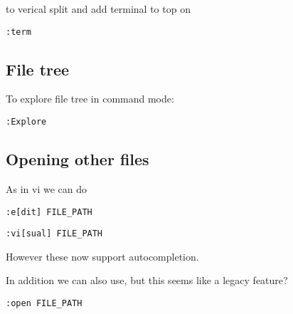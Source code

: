 to verical split and add terminal to top on
\begin{verbatim}
:term
\end{verbatim}


\subsection{File tree}

To explore file tree in command mode:
\begin{verbatim}
:Explore
\end{verbatim}


\subsection{Opening other files}

As in vi we can do 
\begin{verbatim}
:e[dit] FILE_PATH
\end{verbatim}

\begin{verbatim}
:vi[sual] FILE_PATH
\end{verbatim}

However these now support autocompletion.

In addition we can also use, but this seems like a legacy feature?

\begin{verbatim}
:open FILE_PATH
\end{verbatim}


